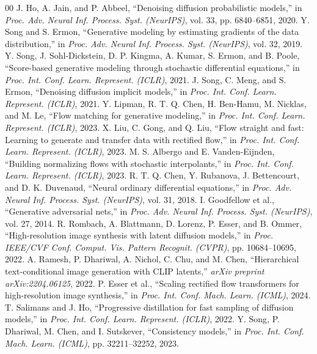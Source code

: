 \documentclass[conference]{IEEEtran}
\begin{document}
\begin{thebibliography}{00}
 J. Ho, A. Jain, and P. Abbeel, ``Denoising diffusion probabilistic models,'' in \textit{Proc. Adv. Neural Inf. Process. Syst. (NeurIPS)}, vol. 33, pp. 6840--6851, 2020.
 Y. Song and S. Ermon, ``Generative modeling by estimating gradients of the data distribution,'' in \textit{Proc. Adv. Neural Inf. Process. Syst. (NeurIPS)}, vol. 32, 2019.
 Y. Song, J. Sohl-Dickstein, D. P. Kingma, A. Kumar, S. Ermon, and B. Poole, ``Score-based generative modeling through stochastic differential equations,'' in \textit{Proc. Int. Conf. Learn. Represent. (ICLR)}, 2021.
 J. Song, C. Meng, and S. Ermon, ``Denoising diffusion implicit models,'' in \textit{Proc. Int. Conf. Learn. Represent. (ICLR)}, 2021.
 Y. Lipman, R. T. Q. Chen, H. Ben-Hamu, M. Nicklas, and M. Le, ``Flow matching for generative modeling,'' in \textit{Proc. Int. Conf. Learn. Represent. (ICLR)}, 2023.
 X. Liu, C. Gong, and Q. Liu, ``Flow straight and fast: Learning to generate and transfer data with rectified flow,'' in \textit{Proc. Int. Conf. Learn. Represent. (ICLR)}, 2023.
 M. S. Albergo and E. Vanden-Eijnden, ``Building normalizing flows with stochastic interpolants,'' in \textit{Proc. Int. Conf. Learn. Represent. (ICLR)}, 2023.
 R. T. Q. Chen, Y. Rubanova, J. Bettencourt, and D. K. Duvenaud, ``Neural ordinary differential equations,'' in \textit{Proc. Adv. Neural Inf. Process. Syst. (NeurIPS)}, vol. 31, 2018.
 I. Goodfellow et al., ``Generative adversarial nets,'' in \textit{Proc. Adv. Neural Inf. Process. Syst. (NeurIPS)}, vol. 27, 2014.
 R. Rombach, A. Blattmann, D. Lorenz, P. Esser, and B. Ommer, ``High-resolution image synthesis with latent diffusion models,'' in \textit{Proc. IEEE/CVF Conf. Comput. Vis. Pattern Recognit. (CVPR)}, pp. 10684--10695, 2022.
 A. Ramesh, P. Dhariwal, A. Nichol, C. Chu, and M. Chen, ``Hierarchical text-conditional image generation with CLIP latents,'' \textit{arXiv preprint arXiv:2204.06125}, 2022.
 P. Esser et al., ``Scaling rectified flow transformers for high-resolution image synthesis,'' in \textit{Proc. Int. Conf. Mach. Learn. (ICML)}, 2024.
 T. Salimans and J. Ho, ``Progressive distillation for fast sampling of diffusion models,'' in \textit{Proc. Int. Conf. Learn. Represent. (ICLR)}, 2022.
 Y. Song, P. Dhariwal, M. Chen, and I. Sutskever, ``Consistency models,'' in \textit{Proc. Int. Conf. Mach. Learn. (ICML)}, pp. 32211--32252, 2023.
\end{thebibliography}
\end{document}
